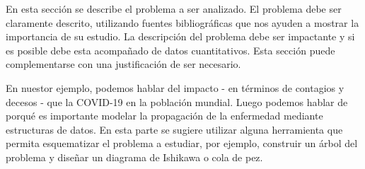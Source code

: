 En esta sección se describe el problema a ser analizado. El problema debe ser claramente descrito, utilizando fuentes bibliográficas que nos ayuden a mostrar la importancia de su estudio. La descripción del problema debe ser impactante y si es posible debe esta acompañado de datos cuantitativos. Esta sección puede complementarse con una justificación de ser necesario.\\

\begin{tcolorbox}[colback=blue!5!white,colframe=blue!75!black,title=Ejemplo]
En nuestor ejemplo, podemos hablar del impacto - en términos de contagios y decesos - que la COVID-19 en la población mundial. Luego podemos hablar de porqué es importante modelar la propagación de la enfermedad mediante estructuras de datos. En esta parte se sugiere utilizar alguna herramienta que permita esquematizar el problema a estudiar, por ejemplo, construir un árbol del problema y diseñar un diagrama de Ishikawa o cola de pez.
\end{tcolorbox}
